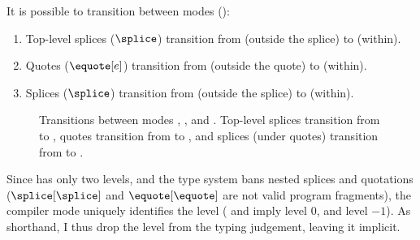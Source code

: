 It is possible to transition between modes ():
\begin{enumerate}
  \item Top-level splices ($\splice$) transition from \compilemode{} (outside the splice) to \splicemode{} (within).
  \item Quotes ($\equote[e]$) transition from \splicemode{} (outside the quote) to \quotemode{} (within).
  \item Splices ($\splice$) transition from \quotemode{} (outside the splice) to \splicemode{} (within).
\end{enumerate}

\begin{figure}
  \centering
{}
\caption{Transitions between modes \compilemode{}, \splicemode{}, and \quotemode{}. Top-level splices transition from \compilemode{} to \splicemode{}, quotes transition from \splicemode{} to \quotemode{}, and splices (under quotes) transition from \quotemode{} to \splicemode{}.}%
\label{fig:compiler-mode-transitions}
\end{figure}

Since \sourceLang{} has only two levels, and the type system bans nested splices and quotations ($\splice[\splice]$ and $\equote[\equote]$ are not valid program fragments), the compiler mode uniquely identifies the level (\compilemode{} and \quotemode{} imply level $0$, and \splicemode{} level $-1$). As shorthand, I thus drop the level from the typing judgement, leaving it implicit.

\newcommand{\cqtypejudge}[3][\Gamma]{{#1} \vdash_{\compilemode \mid \quotemode} {#2} : {#3}}
\newcommand{\ctypejudge}[3][\Gamma]{{#1} \vdash_{\compilemode} {#2} : {#3}}
\newcommand{\qtypejudge}[3][\Gamma]{{#1} \vdash_{\quotemode} {#2} : {#3}}
\newcommand{\stypejudge}[3][\Gamma]{{#1} \vdash_{\splicemode} {#2} : {#3}}

